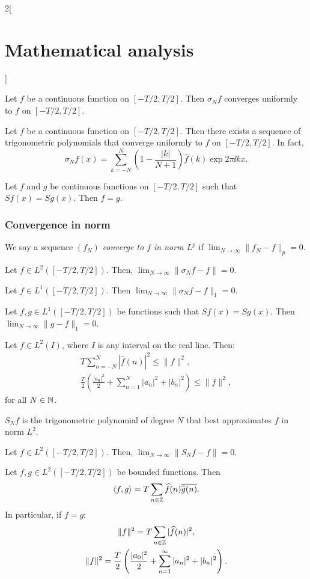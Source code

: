 \documentclass[../../../main.tex]{subfiles}
\begin{document}
\begin{multicols}{2}[\section{Mathematical analysis}]
\begin{theorem}
Let $f$ be a continuous function on $[-T/2,T/2]$. Then $\sigma_Nf$ converges uniformly to $f$ on $[-T/2,T/2]$.
\end{theorem}
\begin{corollary}
Let $f$ be a continuous function on $[-T/2,T/2]$. Then there exists a sequence of trigonometric polynomials that converge uniformly to $f$ on $[-T/2,T/2]$. In fact, $$\sigma_Nf(x)=\sum_{k=-N}^N\left(1-\frac{|k|}{N+1}\right)\widehat{f}(k)\exp{2\pi\ii kx}.$$
\end{corollary}
\begin{corollary}
Let $f$ and $g$ be continuous functions on $[-T/2,T/2]$ such that $Sf(x)=Sg(x)$. Then $f=g$.
\end{corollary}
\subsubsection*{Convergence in norm}
\begin{definition}
We say a sequence $(f_N)$ \textit{converge to $f$ in norm $L^p$} if $\displaystyle\lim_{N\to\infty}\|f_N-f\|_p=0$.
\end{definition}
\begin{theorem}
Let $f\in L^2([-T/2,T/2])$. Then, $\displaystyle\lim_{N\to\infty}\|\sigma_Nf-f\|=0$.
\end{theorem}
\begin{corollary}
Let $f\in L^1([-T/2,T/2])$. Then $\displaystyle\lim_{N\to\infty}\|\sigma_Nf-f\|_1=0$.
\end{corollary}
\begin{corollary}
Let $f,g\in L^1([-T/2,T/2])$ be functions such that $Sf(x)=Sg(x)$. Then $\displaystyle\lim_{N\to\infty}\|g-f\|_1=0$.
\end{corollary}
\begin{theorem}
Let $f\in L^2(I)$, where $I$ is any interval on the real line. Then: \begin{gather*}T\sum_{n=-N}^N|\widehat{f}(n)|^2\leq\|f\|^2,\\\frac{T}{2}\left(\frac{|a_0|^2}{2}+\sum_{n=1}^N|a_n|^2+|b_n|^2\right)\leq \|f\|^2,\end{gather*} for all $N\in\mathbb{N} $.
\end{theorem}
\begin{theorem}
$S_Nf$ is the trigonometric polynomial of degree $N$ that best approximates $f$ in norm $L^2$.
\end{theorem}
\begin{corollary}
Let $f\in L^2([-T/2,T/2])$. Then, $\displaystyle\lim_{N\to\infty}\|S_Nf-f\|=0$.
\end{corollary}
\begin{theorem}
Let $f,g\in L^2([-T/2,T/2])$ be bounded functions. Then $$\langle f,g\rangle=T\sum_{n\in\mathbb{Z} }\widehat{f}(n)\overline{\widehat{g}(n)}.$$
In particular, if $f=g$:
\begin{gather*}\|f\|^2=T\sum_{n\in\mathbb{Z} }|\widehat{f}(n)|^2,\\\|f\|^2=\frac{T}{2}\left(\frac{|a_0|^2}{2}+\sum_{n=1}^\infty|a_n|^2+|b_n|^2\right).\end{gather*}
\end{theorem}

\end{multicols}
\end{document}
